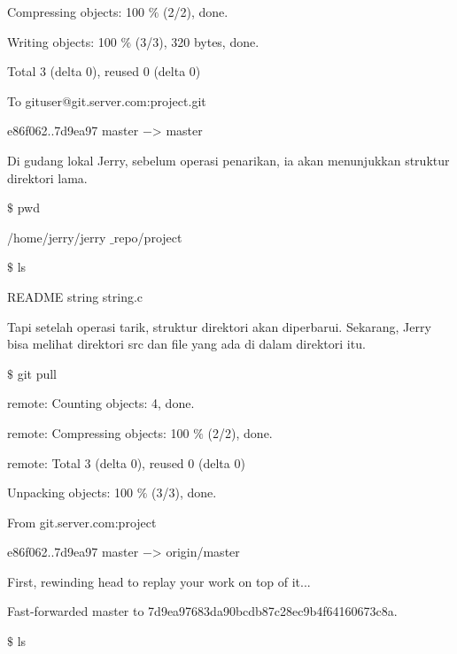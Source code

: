 \noindent 
Compressing objects: 100 $  \%  $ (2/2), done. \par
\noindent 
Writing objects: 100 $  \%  $ (3/3), 320 bytes, done. \par
\noindent 
Total 3 (delta 0), reused 0 (delta 0) \par
\noindent 
To gituser@git.server.com:project.git \par
\noindent 
e86f062..7d9ea97 master  $ - $> master \par
\vspace{12pt}
\vspace{12pt}
\noindent 
 \hspace*{0.5in} Di gudang lokal Jerry, sebelum operasi penarikan, ia akan menunjukkan struktur direktori lama. \par
\vspace{12pt}
 $  \$  $ pwd \par
\noindent 
/home/jerry/jerry $  \_  $repo/project \par
\vspace{12pt}
 $  \$  $ ls \par
\noindent 
README string string.c \par
\vspace{12pt}
\noindent 
 \hspace*{0.5in} Tapi setelah operasi tarik, struktur direktori akan diperbarui. Sekarang, Jerry bisa melihat direktori src dan file yang ada di dalam direktori itu. \par
{} $  \$  $ git pull \par
\noindent 
remote: Counting objects: 4, done. \par
\noindent 
remote: Compressing objects: 100 $  \%  $ (2/2), done. \par
\noindent 
remote: Total 3 (delta 0), reused 0 (delta 0) \par
\noindent 
Unpacking objects: 100 $  \%  $ (3/3), done. \par
\noindent 
From git.server.com:project \par
\noindent 
e86f062..7d9ea97 master  $ - $> origin/master \par
\noindent 
First, rewinding head to replay your work on top of it... \par
\noindent 
Fast-forwarded master to 7d9ea97683da90bcdb87c28ec9b4f64160673c8a. \par
\vspace{12pt}
 $  \$  $ ls \par
